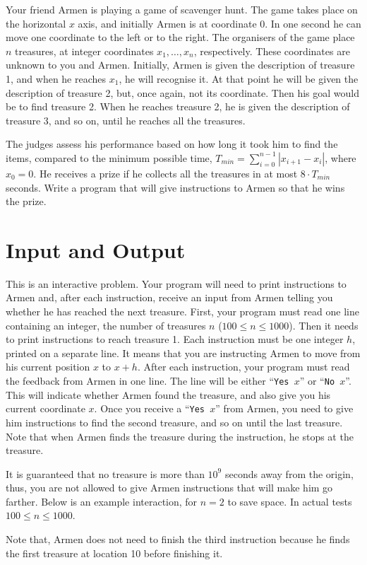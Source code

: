 
Your friend Armen is playing a game of scavenger hunt.
The game takes place on the horizontal $x$ axis, and initially Armen is at coordinate $0$.
In one second he can move one coordinate to the left or to the right.
The organisers of the game place $n$ treasures, at integer coordinates $x_1,\dots, x_n$, respectively.
These coordinates are unknown to you and Armen.
Initially, Armen is given the description of treasure 1, and when he reaches $x_1$, he will recognise it.
At that point he will be given the description of treasure 2, but, once again, not its coordinate.
Then his goal would be to find treasure 2.
When he reaches treasure 2, he is given the description of treasure 3, and so on, until he reaches all the treasures.

The judges assess his performance based on how long it took him to find the items, compared to the minimum possible time, $T_{min} = \sum_{i = 0}^{n-1}|x_{i + 1} - x_i|$, where $x_0 = 0$.
He receives a prize if he collects all the treasures in at most $8 \cdot T_{min}$ seconds.
Write a program that will give instructions to Armen so that he wins the prize.

\section*{Input and Output}
This is an interactive problem.
Your program will need to print instructions to Armen and, after each instruction, receive an input from Armen telling you whether he has reached the next treasure.
First, your program must read one line containing an integer, the number of treasures $n$ ($100 \leq n \leq 1000$).
Then it needs to print instructions to reach treasure 1.
Each instruction must be one integer $h$, printed on a separate line.
It means that you are instructing Armen to move from his current position $x$ to $x + h$.
After each instruction, your program must read the feedback from Armen in one line.
The line will be either ``\texttt{Yes }$x$'' or ``\texttt{No }$x$''.
This will indicate whether Armen found the treasure, and also give you his current coordinate $x$.
Once you receive a ``\texttt{Yes }$x$'' from Armen, you need to give him instructions to find the second treasure, and so on until the last treasure.
Note that when Armen finds the treasure during the instruction, he stops at the treasure.

It is guaranteed that no treasure is more than $10^9$ seconds away from the origin, thus, you are not allowed to give Armen instructions that will make him go farther.
Below is an example interaction, for $n = 2$ to save space.
In actual tests $100 \leq n \leq 1000$.

{
\renewcommand{\sampleinputname}{Armen's feedback}
\renewcommand{\sampleoutputname}{Your instructions}
}

Note that, Armen does not need to finish the third instruction because he finds the first treasure at location 10 before finishing it.

